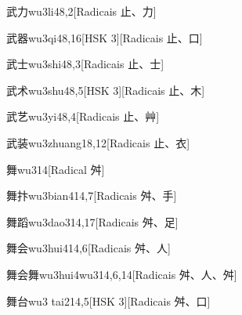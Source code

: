 \begin{entry}{武力}{wu3li4}{8,2}[Radicais ⽌、⼒]
\end{entry}

\begin{entry}{武器}{wu3qi4}{8,16}[HSK 3][Radicais ⽌、⼝]
\end{entry}

\begin{entry}{武士}{wu3shi4}{8,3}[Radicais ⽌、⼠]
\end{entry}

\begin{entry}{武术}{wu3shu4}{8,5}[HSK 3][Radicais ⽌、⽊]
\end{entry}

\begin{entry}{武艺}{wu3yi4}{8,4}[Radicais ⽌、⾋]
\end{entry}

\begin{entry}{武装}{wu3zhuang1}{8,12}[Radicais ⽌、⾐]
\end{entry}

\begin{entry}{舞}{wu3}{14}[Radical ⾇]
\end{entry}

\begin{entry}{舞抃}{wu3bian4}{14,7}[Radicais ⾇、⼿]
\end{entry}

\begin{entry}{舞蹈}{wu3dao3}{14,17}[Radicais ⾇、⾜]
\end{entry}

\begin{entry}{舞会}{wu3hui4}{14,6}[Radicais ⾇、⼈]
\end{entry}

\begin{entry}{舞会舞}{wu3hui4wu3}{14,6,14}[Radicais ⾇、⼈、⾇]
\end{entry}

\begin{entry}{舞台}{wu3 tai2}{14,5}[HSK 3][Radicais ⾇、⼝]
\end{entry}

